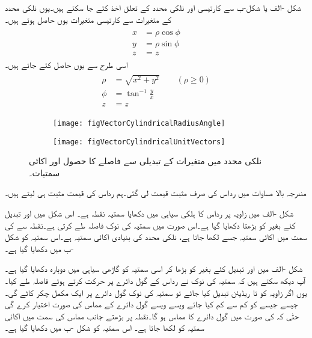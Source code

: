 شکل -الف یا شکل-ب سے کارتیسی اور نلکی محدد کے تعلق اخذ کئے جا سکتے ہیں۔یوں نلکی محدد کے متغیرات  سے کارتیسی متغیرات  یوں حاصل ہوتے ہیں۔
\begin{gather}
\begin{aligned}
x&=\rho \cos \phi\\
y&=\rho \sin \phi\\
z&=z
\end{aligned}
\end{gather}
اسی طرح  سے   یوں حاصل کئے جاتے ہیں۔
\begin{gather}
\begin{aligned}
\rho&=\sqrt{x^2+y^2} \quad \quad (\rho \ge 0)\\
\phi&=\tan^{-1} \frac{y}{x}\\
z&=z
\end{aligned}
\end{gather}
%
\begin{figure}
\centering
\begin{subfigure}{0.5\textwidth}
\centering
\texttt{[image: figVectorCylindricalRadiusAngle]}
\end{subfigure}%
%
\begin{subfigure}{0.5\textwidth}
\centering
\texttt{[image: figVectorCylindricalUnitVectors]}
\end{subfigure}%
\caption{نلکی محدد میں متغیرات کے تبدیلی سے فاصلے کا حصول اور اکائی سمتیات۔}
\label{شکل_سمتیہ_نلکی_تبدیلی_متغیرات}
\end{figure}
مندرجہ بالا مساوات میں رداس کی صرف مثبت قیمت لی گئی۔ہم  رداس کی قیمت مثبت ہی لیتے ہیں۔

شکل -الف میں  زاویہ پر  رداس کا ہلکی سیاہی میں دکھایا سمتیہ نقطہ  ہے۔
اس شکل میں  اور  تبدیل کئے بغیر  کو  بڑھتا دکھایا گیا ہے۔اس صورت میں سمتیہ کی نوک  فاصلہ طے کرتی ہے۔نقطہ  سے  کی سمت میں اکائی سمتیہ جسے  لکھا جاتا ہے، نلکی محدد کی  بنیادی اکائی سمتیہ ہے۔اس سمتیہ کو شکل -ب میں دکھایا گیا ہے۔

شکل -الف میں    اور  تبدیل کئے بغیر  کو  بڑھا کر اسی سمتیہ کو گاڑھی سیاہی میں دوبارہ دکھایا گیا ہے۔آپ دیکھ سکتے ہیں کہ  سمتیہ کی نوک نے  رداس کے گول دائرے پر حرکت کرتے ہوئے   فاصلہ طے کیا۔یوں اگر زاویہ کو  تا  ریڈیئن تبدیل کیا جائے  تو سمتیہ کی نوک گول دائرے پر ایک مکمل چکر کاٹے گی۔جیسے جیسے  کو کم سے کم کیا جائے ویسے ویسے    گول دائرے کے مماس کی صورت اختیار کرے گی حتٰی کہ  کی صورت میں  گول دائرے کا مماس ہو گا۔نقطہ  پر بڑھتے  جانب مماس کی سمت میں اکائی سمتیہ کو  لکھا جاتا ہے۔ اس سمتیہ کو شکل -ب میں دکھایا گیا ہے۔

